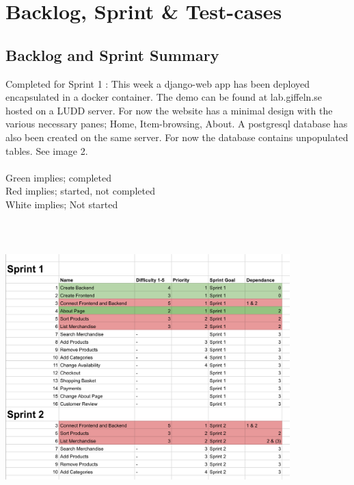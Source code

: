 \newpage
\section{Backlog, Sprint \& Test-cases}

\subsection{Backlog and Sprint Summary}
Completed for Sprint 1 :
This week a django-web app has been deployed encapsulated in a docker container. The demo can be found at lab.giffeln.se hosted on a LUDD server. For now the website has a minimal design with the various necessary panes; Home, Item-browsing, About. A postgresql database has also been created on the same server. For now the database contains unpopulated tables. See image 2. 
\\
\\
Green implies; completed
\\
Red implies; started, not completed 
\\  
White implies; Not started
\\
\includegraphics[height=12cm, width=11cm]{first_sprint/backlog.png}

\newpage
